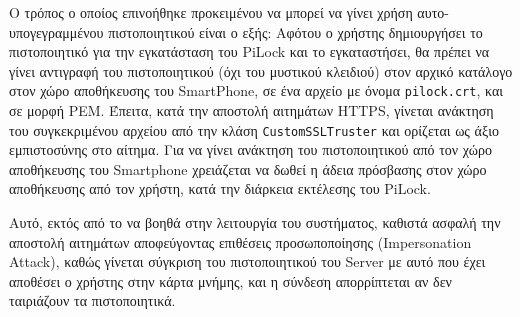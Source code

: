 		Ο τρόπος ο οποίος επινοήθηκε προκειμένου να μπορεί να γίνει χρήση αυτο-υπογεγραμμένου πιστοποιητικού είναι ο εξής: Αφότου ο χρήστης δημιουργήσει το πιστοποιητικό για την εγκατάσταση του PiLock και το εγκαταστήσει, θα πρέπει να γίνει αντιγραφή του πιστοποιητικού (όχι του μυστικού κλειδιού) στον αρχικό κατάλογο στον χώρο αποθήκευσης του SmartPhone, σε ένα αρχείο με όνομα \verb|pilock.crt|, και σε μορφή PEM. Έπειτα, κατά την αποστολή αιτημάτων HTTPS, γίνεται ανάκτηση του συγκεκριμένου αρχείου από την κλάση \verb|CustomSSLTruster| και ορίζεται ως άξιο εμπιστοσύνης στο αίτημα. Για να γίνει ανάκτηση του πιστοποιητικού από τον χώρο αποθήκευσης του Smartphone χρειάζεται να δωθεί η άδεια πρόσβασης στον χώρο αποθήκευσης από τον χρήστη, κατά την διάρκεια εκτέλεσης του PiLock.

		Αυτό, εκτός από το να βοηθά στην λειτουργία του συστήματος, καθιστά ασφαλή την αποστολή αιτημάτων αποφεύγοντας επιθέσεις προσωποποίησης (Impersonation Attack), καθώς γίνεται σύγκριση του πιστοποιητικού του Server με αυτό που έχει αποθέσει ο χρήστης στην κάρτα μνήμης, και η σύνδεση απορρίπτεται αν δεν ταιριάζουν τα πιστοποιητικά.
